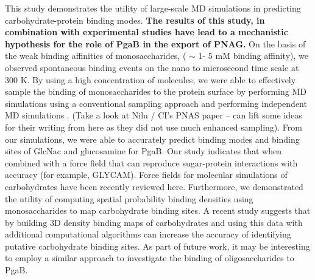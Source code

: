This study demonstrates the utility of large-scale MD simulations in predicting carbohydrate-protein binding modes. \textbf{The results of this study, in combination with experimental studies have lead to a mechanistic hypothesis for the role of PgaB in the export of PNAG.} 
On the basis of the weak binding affinities of monosaccharides,  %
( $\sim$ 1- 5 mM binding affinity), we observed spontaneous binding events on the nano to microsecond time scale at 300 K.  By using a high concentration of molecules, we were able to effectively sample the binding of monosaccharides to the protein surface by performing MD simulations using a conventional sampling approach and performing independent MD simulations . (Take a look at Nilu / CI's PNAS paper -- can lift some ideas for their writing from here as they did not use much enhanced sampling).
From our simulations, we were able to accurately predict binding modes and binding sites of GlcNac and glucosamine for PgaB. Our study indicates that when combined with a force field that can reproduce sugar-protein interactions with accuracy (for example, GLYCAM\cite{Kirschner:2008ii}). Force fields for molecular simulations of carbohydrates have been recently reviewed here.\cite{Fadda:2010p5889} Furthermore, we demonstrated the utility of computing spatial probability binding densities using monosaccharides to map carbohydrate binding sites. A recent study suggests that by building 3D density binding maps of carbohydrates and using this data with additional computational algorithms can increase the accuracy of identifying putative carbohydrate binding sites.\cite{Tsai:2012bj} As part of future work, it may be interesting to employ a similar approach to investigate the binding of oligosaccharides to PgaB.



